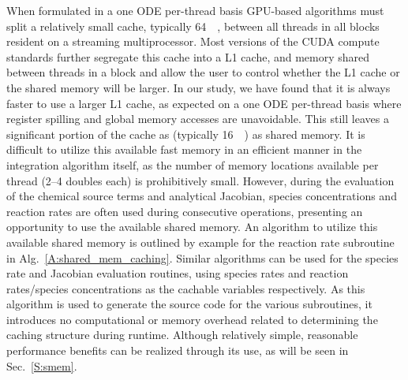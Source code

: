 \documentclass[preprint]{elsarticle}
\begin{document}
When formulated in a one ODE per-thread basis GPU-based algorithms must split a relatively small cache, typically \SI{64}{\kilo\byte}, between all threads in all blocks resident on a streaming multiprocessor.
Most versions of the CUDA compute standards further segregate this cache into a L1 cache, and memory shared between threads in a block and allow the user to control whether the L1 cache or the shared memory will be larger.
In our study, we have found that it is always faster to use a larger L1 cache, as expected on a one ODE per-thread basis where register spilling and global memory accesses are unavoidable.
This still leaves a significant portion of the cache as (typically \SI{16}{\kilo\byte}) as shared memory.
It is difficult to utilize this available fast memory in an efficient manner in the integration algorithm itself, as the number of memory locations available per thread (2--4 doubles each) is prohibitively small.
However, during the evaluation of the chemical source terms and analytical Jacobian, species concentrations and reaction rates are often used during consecutive operations, presenting an opportunity to use the available shared memory.
An algorithm to utilize this available shared memory is outlined by example for the reaction rate subroutine in Alg.~\ref{A:shared_mem_caching}.
Similar algorithms can be used for the species rate and Jacobian evaluation routines, using species rates and reaction rates\slash species concentrations as the cachable variables respectively.
As this algorithm is used to generate the source code for the various subroutines, it introduces no computational or memory overhead related to determining the caching structure during runtime.
Although relatively simple, reasonable performance benefits can be realized through its use, as will be seen in Sec.~\ref{S:smem}.
\end{document}
